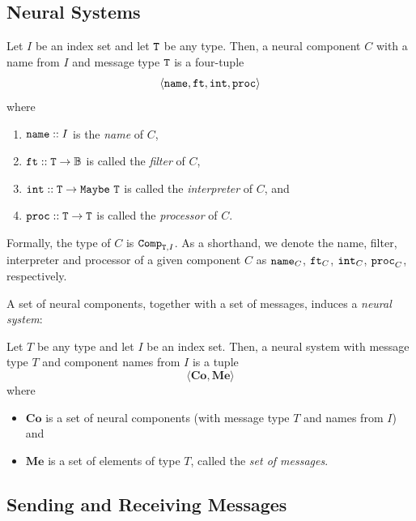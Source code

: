 \subsection{Neural Systems}\label{sec:mathematicalNeuralSystem}

\begin{definition}
	Let $I$ be an index set and let $\mathtt{T}$ be any type. Then, a neural component $C$ with a name from $I$ and message type $\mathtt{T}$ is a four-tuple
	$$
	\langle \mathtt{name}, \mathtt{ft}, \mathtt{int}, \mathtt{proc} \rangle
	$$
	where
	\begin{enumerate}
		\item $\mathtt{name} :: I$ is the {\em name} of $C$,
		\item $\mathtt{ft} :: \mathtt{T \rightarrow \mathbb{B}}$ is  called the {\em filter} of $C$,
		\item $\mathtt{int} :: \mathtt{T} \rightarrow \mathtt{Maybe\ T}$ is called the {\em interpreter} of $C$, and
		\item $\mathtt{proc} :: \mathtt{T} \rightarrow \mathtt{T}$ is called the {\em processor} of $C$.
	\end{enumerate}
	
	Formally, the type of $C$ is $\mathtt{Comp}_{\mathtt{T},I}$. As a shorthand, we denote the name, filter, interpreter and processor of a given component $C$ as $\mathtt{name}_C$, $\mathtt{ft}_C$, $\mathtt{int}_C$, $\mathtt{proc}_C$, respectively.
\end{definition}

\noindent
A set of neural components, together with a set of messages, induces a {\em neural system}:

\begin{definition}
	Let $T$ be any type and let $I$ be an index set. Then, a neural system with message type $T$ and component names from $I$ is a tuple
	$$
	\langle \textbf{Co}, \textbf{Me} \rangle
	$$
	where
	\begin{itemize}
		\item $\textbf{Co}$ is a set of neural components (with message type $T$ and names from $I$) and
		\item $\textbf{Me}$ is a set of elements of type $T$, called the {\em set of messages}.
	\end{itemize}
\end{definition}

\subsection{Sending and Receiving Messages}\label{sec:notation}

